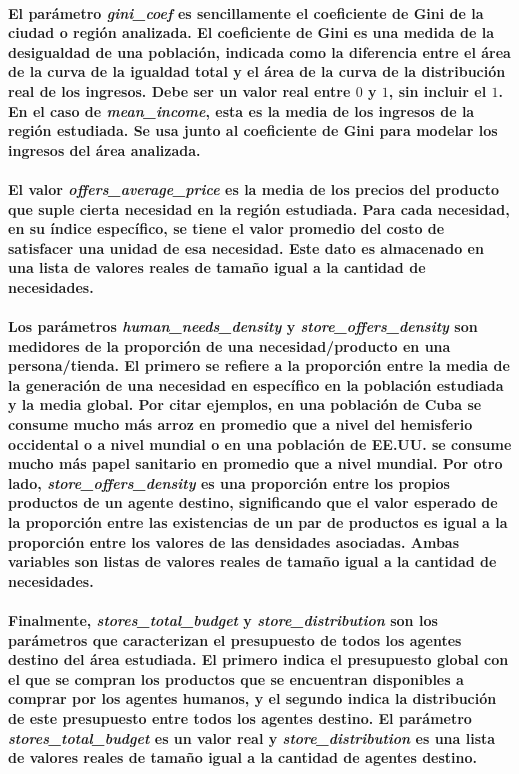 \documentclass[12pt]{amsart}
\begin{document}
\paragraph{El parámetro \textit{gini\_coef} es sencillamente el coeficiente de Gini \cite{vars2} de la ciudad o región analizada. El coeficiente de Gini es una medida de la desigualdad de una población, indicada como la diferencia entre el área de la curva de la igualdad total y el área de la curva de la distribución real de los ingresos. Debe ser un valor real entre $0$ y $1$, sin incluir el $1$. En el caso de \textit{mean\_income}, esta es la media de los ingresos de la región estudiada. Se usa junto al coeficiente de Gini para modelar los ingresos del área analizada.}

\paragraph{El valor \textit{offers\_average\_price} es la media de los precios del producto que suple cierta necesidad en la región estudiada. Para cada necesidad, en su índice específico, se tiene el valor promedio del costo de satisfacer una unidad de esa necesidad. Este dato es almacenado en una lista de valores reales de tamaño igual a la cantidad de necesidades.}

\paragraph{Los parámetros \textit{human\_needs\_density} y \textit{store\_offers\_density} son medidores de la proporción de una necesidad/producto en una persona/tienda. El primero se refiere a la proporción entre la media de la generación de una necesidad en específico en la población estudiada y la media global. Por citar ejemplos, en una población de Cuba se consume mucho más arroz en promedio que a nivel del hemisferio occidental o a nivel mundial o en una población de EE.UU. se consume mucho más papel sanitario en promedio que a nivel mundial. Por otro lado, \textit{store\_offers\_density} es una proporción entre los propios productos de un agente destino, significando que el valor esperado de la proporción entre las existencias de un par de productos es igual a la proporción entre los valores de las densidades asociadas. Ambas variables son listas de valores reales de tamaño igual a la cantidad de necesidades.}

\paragraph{Finalmente,  \textit{stores\_total\_budget} y  \textit{store\_distribution} son los parámetros que caracterizan el presupuesto de todos los agentes destino del área estudiada. El primero indica el presupuesto global con el que se compran los productos que se encuentran disponibles a comprar por los agentes humanos, y el segundo indica la distribución de este presupuesto entre todos los agentes destino. El parámetro \textit{stores\_total\_budget}  es un valor real y \textit{store\_distribution} es una lista de valores reales de tamaño igual a la cantidad de agentes destino.}
\end{document}
